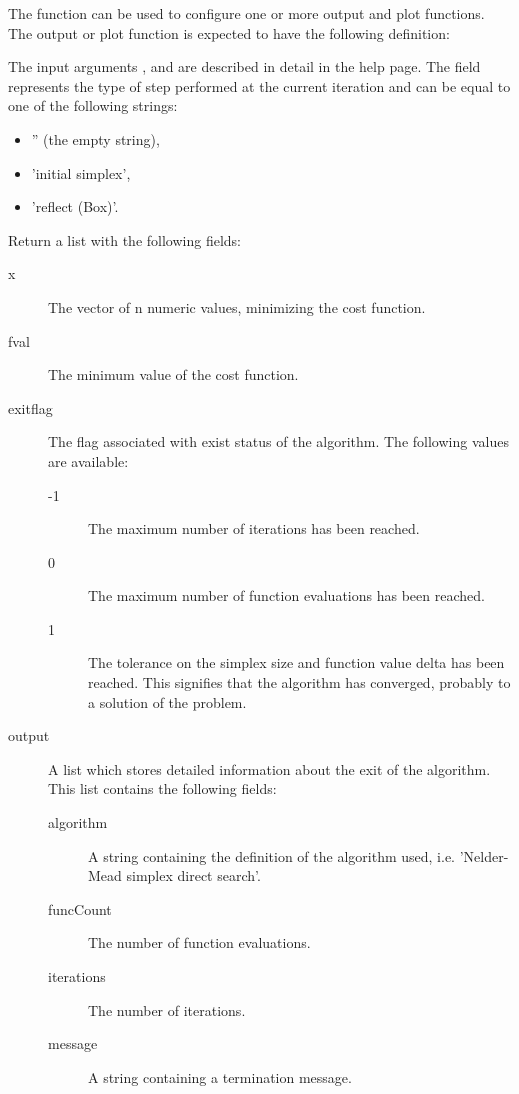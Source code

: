 \begin{Details}

The  function can be used to configure one or more output and
plot functions.
The output or plot function is expected to have the following definition:


The input arguments ,  and  are
described in detail in the  help page. The
 field represents the type of step performed at
the current iteration and can be equal to one of the following strings:
\begin{itemize}

\item '' (the empty string),
\item 'initial simplex',
\item 'reflect (Box)'.

\end{itemize}

\end{Details}
%
\begin{Value}
Return a list with the following fields:\begin{description}

\item[x] The vector of n numeric values, minimizing the cost function.
\item[fval] The minimum value of the cost function.
\item[exitflag] The flag associated with exist status of the algorithm.
The following values are available:\begin{description}

\item[-1] The maximum number of iterations has been reached.
\item[0] The maximum number of function evaluations has been reached.
\item[1] The tolerance on the simplex size and function value delta has
been reached. This signifies that the algorithm has converged,
probably to a solution of the problem.

\end{description}


\item[output] A list which stores detailed information about the exit of the
algorithm. This list contains the following fields:\begin{description}

\item[algorithm] A string containing the definition of the algorithm
used, i.e. 'Nelder-Mead simplex direct search'.
\item[funcCount] The number of function evaluations.
\item[iterations] The number of iterations.
\item[message] A string containing a termination message.

\end{description}



\end{description}

\end{Value}
